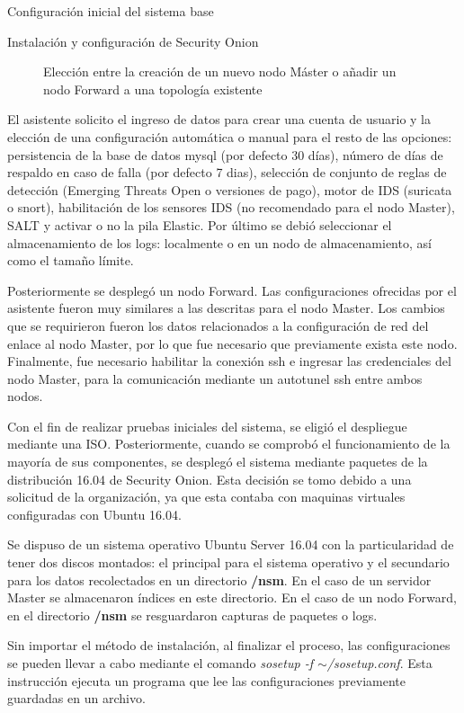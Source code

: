 \begin{section}{Configuración inicial del sistema base}
\begin{subsection}{Instalación y configuración de Security Onion}
\begin{figure}[H]
            \caption{Elección entre la creación de un nuevo nodo Máster o añadir un nodo Forward a una topología existente}
            \label{fig:figura_38_b_sonion_modo}
        \end{figure}
        El asistente solicito el ingreso de datos para crear una cuenta de usuario y la elección de una configuración automática o manual para el resto de las opciones: persistencia de la base de datos mysql (por defecto 30 días), número de días de respaldo en caso de falla (por defecto 7 dias), selección de conjunto de reglas de detección (Emerging Threats Open o versiones de pago), motor de IDS (suricata o snort), habilitación de los sensores IDS (no recomendado para el nodo Master), SALT y activar o no la pila Elastic. Por último se debió seleccionar el almacenamiento de los logs: localmente o en un nodo de almacenamiento, así como el tamaño límite.\par
        Posteriormente se desplegó un nodo Forward. Las configuraciones ofrecidas por el asistente fueron muy similares a las descritas para el nodo Master. Los cambios que se requirieron fueron los datos relacionados a la configuración de red del enlace al nodo Master, por lo que fue necesario que previamente exista este nodo. Finalmente, fue necesario habilitar la conexión ssh e ingresar las credenciales del nodo Master, para la comunicación mediante un autotunel ssh entre ambos nodos.\par
        Con el fin de realizar pruebas iniciales del sistema, se eligió el despliegue mediante una ISO. Posteriormente, cuando se comprobó el funcionamiento de la mayoría de sus componentes, se desplegó el sistema mediante paquetes de la distribución 16.04 de Security Onion. Esta decisión se tomo debido a una solicitud de la organización, ya que esta contaba con maquinas virtuales configuradas con Ubuntu 16.04. \par
        Se dispuso de un sistema operativo Ubuntu Server 16.04 con la particularidad de tener dos discos montados: el principal para el sistema operativo y el secundario para los datos recolectados en un directorio \textbf{/nsm}. En el caso de un servidor Master se almacenaron índices en este directorio. En el caso de un nodo Forward, en el directorio \textbf{/nsm} se resguardaron capturas de paquetes o logs. \par 
        Sin importar el método de instalación, al finalizar el proceso, las configuraciones se pueden llevar a cabo mediante el comando \textit{sosetup -f $\sim$/sosetup.conf}. Esta instrucción ejecuta un programa que lee las configuraciones previamente guardadas en un archivo.\par

\end{subsection}
\end{section}

